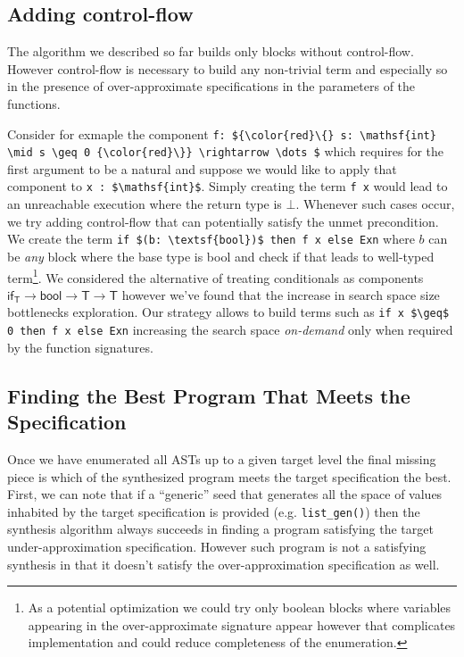 \documentclass[review, sigplan]{acmart}
\begin{document}
\subsection{Adding control-flow}

The algorithm we described so far builds only blocks without
control-flow.
However control-flow is necessary to build any non-trivial term and
especially so in the presence of over-approximate specifications
in the parameters of the functions.

Consider for exmaple the component
\lstinline[basicstyle=\small\ttfamily, mathescape]|f: ${\color{red}\{} s: \mathsf{int} \mid s \geq 0 {\color{red}\}} \rightarrow \dots $|
which requires for the first argument to be a natural and suppose
we would like to apply that component to \lstinline[basicstyle=\small\ttfamily, mathescape]|x : $\mathsf{int}$|.
Simply creating the term \lstinline[language=caml, basicstyle=\small\ttfamily, mathescape]|f x|
would lead to an unreachable execution where the return type is $\bot$.
Whenever such cases occur, we try adding control-flow that can potentially
satisfy the unmet precondition.
We create the term \lstinline[language=caml, basicstyle=\small\ttfamily, mathescape]|if $(b: \textsf{bool})$ then f x else Exn|
where $b$ can be \emph{any} block where the base type is \textsf{bool}
and check if that leads to well-typed term\footnote{
    As a potential optimization we could try only boolean blocks where
    variables appearing in the over-approximate signature appear however
    that complicates implementation and could reduce completeness of the
    enumeration.}.
We considered the alternative of treating conditionals as components
$\textsf{if}_\textsf{T} \rightarrow \textsf{bool} \rightarrow \textsf{T} \rightarrow \textsf{T}$
however we've found that the increase in search space size
bottlenecks exploration.
Our strategy allows to build terms such as
\lstinline[language=caml, basicstyle=\small\ttfamily, mathescape]|if x $\geq$ 0 then f x else Exn|
increasing the search space \emph{on-demand} only when required
by the function signatures.

\subsection{Finding the Best Program That Meets the Specification}
Once we have enumerated all ASTs up to a given target level the
final missing piece is which of the synthesized program
meets the target specification the best.
First, we can note that if a ``generic'' seed that generates
all the space of values inhabited by the target specification is provided
(e.g. \lstinline[language=caml, basicstyle=\small\ttfamily, mathescape]|list_gen()|)
then the synthesis algorithm always succeeds in finding a program satisfying the
target under-approximation specification.
However such program is not a satisfying synthesis in that it doesn't satisfy
the over-approximation specification as well.
\end{document}
